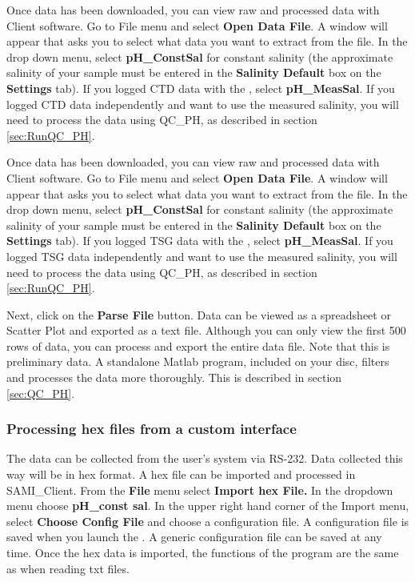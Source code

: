 \or			%

Once data has been downloaded, you can view raw and processed data with \instType{} Client software. Go to File menu and select \textbf{Open Data File}. A window will appear that asks you to select what data you want to extract from the file. In the drop down menu, select \textbf{pH\_ConstSal} for constant salinity (the approximate salinity of your sample must be entered in the \textbf{Salinity Default} box on the \textbf{Settings} tab).  If you logged CTD data with the \instType{}, select \textbf{pH\_MeasSal}. If you logged CTD data independently and want to use the measured salinity, you will need to process the data using QC\_PH, as described in section \ref{sec:RunQC_PH}.

\or			%

Once data has been downloaded, you can view raw and processed data with \instType{} Client software. Go to File menu and select \textbf{Open Data File}. A window will appear that asks you to select what data you want to extract from the file. In the drop down menu, select \textbf{pH\_ConstSal} for constant salinity (the approximate salinity of your sample must be entered in the \textbf{Salinity Default} box on the \textbf{Settings} tab).  If you logged TSG data with the \instType{}, select \textbf{pH\_MeasSal}. If you logged TSG data independently and want to use the measured salinity, you will need to process the data using QC\_PH, as described in section \ref{sec:RunQC_PH}.

\fi

Next, click on the \textbf{Parse File} button. Data can be viewed as a spreadsheet or Scatter Plot and exported as a text file. Although you can only view the first 500 rows of data, you can process and export the entire data file. Note that this is preliminary data.  A standalone Matlab program, included on your disc, filters and processes the data more thoroughly.  This is described in section \ref{sec:QC_PH}.


\subsubsection{Processing hex files from a custom interface}

The \instType{} data can be collected from the user's system via RS-232.  Data collected this way will be in hex format.  A hex file can be imported and processed in SAMI\_Client. From the \textbf{File} menu select \textbf{Import hex File.}  In the dropdown menu choose \textbf{pH\_const sal}. In the upper right hand corner of the Import menu, select \textbf{Choose Config File} and choose a configuration file.  A configuration file is saved when you launch the \instType{}. A generic configuration file can be saved at any time.  Once the hex data is imported, the functions of the program are the same as when reading \instType{} txt files.